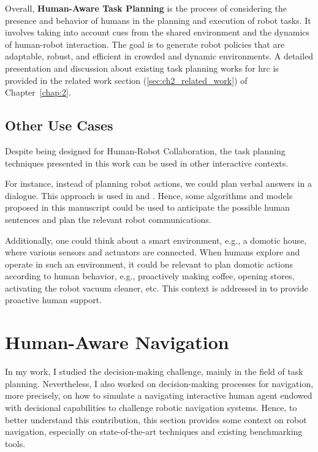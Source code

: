 Overall, \textbf{Human-Aware Task Planning} is the process of considering the presence and behavior of humans in the planning and execution of robot tasks. It involves taking into account cues from the shared environment and the dynamics of human-robot interaction. The goal is to generate robot policies that are adaptable, robust, and efficient in crowded and dynamic environments. A detailed presentation and discussion about existing task planning works for \acrshort{hrc} is provided in the related work section (\ref{sec:ch2_related_work}) of Chapter~\ref{chap:2}.  

\subsection{Other Use Cases}

Despite being designed for Human-Robot Collaboration, the task planning techniques presented in this work can be used in other interactive contexts. 

For instance, instead of planning robot actions, we could plan verbal answers in a dialogue. 
This approach is used in \cite{de_carolis_verbal_2000} and \cite{de_carolis_behavior_2001}.
Hence, some algorithms and models proposed in this manuscript could be used to anticipate the possible human sentences and plan the relevant robot communications. 

Additionally, one could think about a smart environment, e.g., a domotic house, where various sensors and actuators are connected. When humans explore and operate in such an environment, it could be relevant to plan domotic actions according to human behavior, e.g., proactively making coffee, opening stores, activating the robot vacuum cleaner, etc. This context is addressed in \cite{pecora_constraint_based_2012} to provide proactive human support.


\section{Human-Aware Navigation}

In my work, I studied the decision-making challenge, mainly in the field of task planning. 
Nevertheless, I also worked on decision-making processes for navigation, more precisely, on how to simulate a navigating interactive human agent endowed with decisional capabilities to challenge robotic navigation systems. Hence, to better understand this contribution, this section provides some context on robot navigation, especially on state-of-the-art techniques and existing benchmarking tools.

